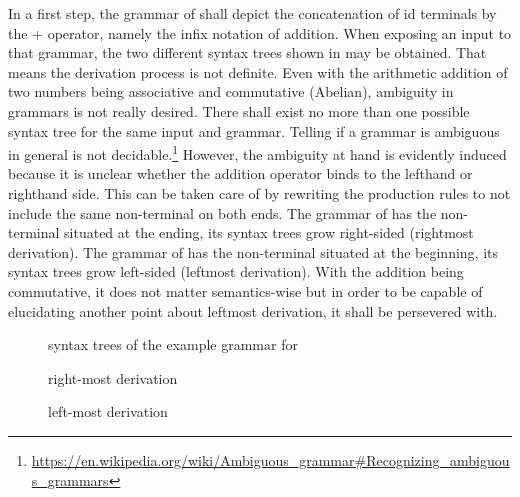 In a first step, the grammar of  shall depict the concatenation of id terminals by the + operator, namely the infix notation of addition. When exposing an input  to that grammar, the two different syntax trees shown in  may be obtained. That means the derivation process is not definite. Even with the arithmetic addition of two numbers being associative and commutative (Abelian), ambiguity in grammars is not really desired. There shall exist no more than one possible syntax tree for the same input and grammar. Telling if a grammar is ambiguous in general is not decidable.\footnote{\url{https://en.wikipedia.org/wiki/Ambiguous_grammar\#Recognizing_ambiguous_grammars}} However, the ambiguity at hand is evidently induced because it is unclear whether the addition operator binds to the lefthand or righthand side. This can be taken care of by rewriting the production rules to not include the same non-terminal on both ends. The grammar of  has the non-terminal situated at the ending, its syntax trees grow right-sided (rightmost derivation). The grammar of  has the non-terminal situated at the beginning, its syntax trees grow left-sided (leftmost derivation). With the addition being commutative, it does not matter semantics-wise but in order to be capable of elucidating another point about leftmost derivation, it shall be persevered with.

\begin{figure}
	\begin{center}
		
	\end{center}

	\caption{syntax trees of the example grammar for }
	\label{fig:tree_example_amb}
\end{figure}

\FloatBarrier

\begin{figure}
	\centering
	
	

	\caption{right-most derivation}
	\label{fig:grammar_example_exp_RR}
\end{figure}

\begin{figure}
	

	\caption{left-most derivation}
	\label{fig:grammar_example_exp_LR}
\end{figure}

